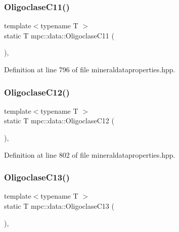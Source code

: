 \subsubsection{\texorpdfstring{Oligoclase\+C11()}{OligoclaseC11()}}
{\footnotesize\ttfamily template$<$typename T $>$ \\
static T mpc\+::data\+::\+Oligoclase\+C11 (\begin{DoxyParamCaption}{ }\end{DoxyParamCaption})\hspace{0.3cm}{\ttfamily [inline]}, {\ttfamily [static]}}



Definition at line 796 of file mineraldataproperties.\+hpp.

\mbox{\label{namespacempc_1_1data_ab4e3433fbf2cceafeea716ad422a21f5}} 
\subsubsection{\texorpdfstring{Oligoclase\+C12()}{OligoclaseC12()}}
{\footnotesize\ttfamily template$<$typename T $>$ \\
static T mpc\+::data\+::\+Oligoclase\+C12 (\begin{DoxyParamCaption}{ }\end{DoxyParamCaption})\hspace{0.3cm}{\ttfamily [inline]}, {\ttfamily [static]}}



Definition at line 802 of file mineraldataproperties.\+hpp.

\mbox{\label{namespacempc_1_1data_acfba49131f71114b663855f35e5742c0}} 
\subsubsection{\texorpdfstring{Oligoclase\+C13()}{OligoclaseC13()}}
{\footnotesize\ttfamily template$<$typename T $>$ \\
static T mpc\+::data\+::\+Oligoclase\+C13 (\begin{DoxyParamCaption}{ }\end{DoxyParamCaption})\hspace{0.3cm}{\ttfamily [inline]}, {\ttfamily [static]}}



